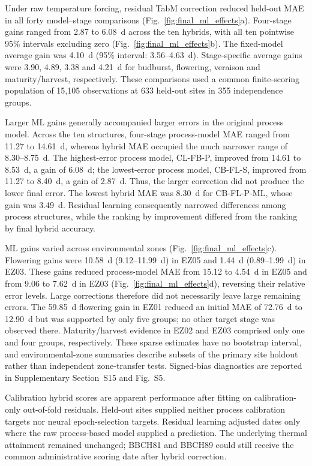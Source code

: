 \documentclass[a4paper,12pt]{article}
\begin{document}
Under raw temperature forcing, residual TabM correction reduced held-out MAE in all forty model--stage comparisons (Fig.~\ref{fig:final_ml_effects}a). Four-stage gains ranged from 2.87 to 6.08~d across the ten hybrids, with all ten pointwise 95\% intervals excluding zero (Fig.~\ref{fig:final_ml_effects}b). The fixed-model average gain was 4.10~d (95\% interval: 3.56--4.63~d). Stage-specific average gains were 3.90, 4.89, 3.38 and 4.21~d for budburst, flowering, veraison and maturity/harvest, respectively. These comparisons used a common finite-scoring population of 15,105 observations at 633 held-out sites in 355 independence groups.

Larger ML gains generally accompanied larger errors in the original process model. Across the ten structures, four-stage process-model MAE ranged from 11.27 to 14.61~d, whereas hybrid MAE occupied the much narrower range of 8.30--8.75~d. The highest-error process model, CL-FB-P, improved from 14.61 to 8.53~d, a gain of 6.08~d; the lowest-error process model, CB-FL-S, improved from 11.27 to 8.40~d, a gain of 2.87~d. Thus, the larger correction did not produce the lower final error. The lowest hybrid MAE was 8.30~d for CB-FL-P-ML, whose gain was 3.49~d. Residual learning consequently narrowed differences among process structures, while the ranking by improvement differed from the ranking by final hybrid accuracy.

ML gains varied across environmental zones (Fig.~\ref{fig:final_ml_effects}c). Flowering gains were 10.58~d (9.12--11.99~d) in EZ05 and 1.44~d (0.89--1.99~d) in EZ03. These gains reduced process-model MAE from 15.12 to 4.54~d in EZ05 and from 9.06 to 7.62~d in EZ03 (Fig.~\ref{fig:final_ml_effects}d), reversing their relative error levels. Large corrections therefore did not necessarily leave large remaining errors. The 59.85~d flowering gain in EZ01 reduced an initial MAE of 72.76~d to 12.90~d but was supported by only five groups; no other target stage was observed there. Maturity/harvest evidence in EZ02 and EZ03 comprised only one and four groups, respectively. These sparse estimates have no bootstrap interval, and environmental-zone summaries describe subsets of the primary site holdout rather than independent zone-transfer tests. Signed-bias diagnostics are reported in Supplementary Section~S15 and Fig.~S5.

Calibration hybrid scores are apparent performance after fitting on calibration-only out-of-fold residuals. Held-out sites supplied neither process calibration targets nor neural epoch-selection targets. Residual learning adjusted dates only where the raw process-based model supplied a prediction. The underlying thermal attainment remained unchanged; BBCH81 and BBCH89 could still receive the common administrative scoring date after hybrid correction.
\end{document}

